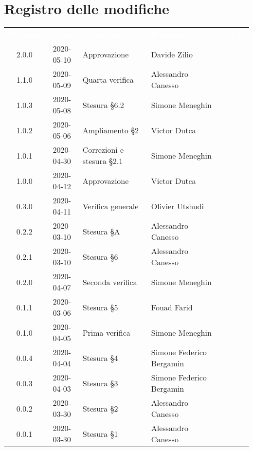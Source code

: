 \section*{Registro delle modifiche}
{
	\centering
	\begin{longtable}{ c c  C{4cm}  C{4cm}  C{3cm} }
		\textcolor{white}{\textbf{Versione}} & \textcolor{white}{\textbf{Data}} & \textcolor{white}{\textbf{Descrizione}} & \textcolor{white}{\textbf{Nominativo}} & \textcolor{white}{\textbf{Ruolo}}\\		
		2.0.0 & 2020-05-10 & Approvazione & Davide Zilio &\RdP{} \\
		1.1.0 & 2020-05-09 & Quarta verifica & Alessandro Canesso &\ver{} \\
		1.0.3 & 2020-05-08 & Stesura \S 6.2 & Simone Meneghin &\adm{} \\
		1.0.2 & 2020-05-06 & Ampliamento \S 2 & Victor Dutca &\Res{} \\
		1.0.1 & 2020-04-30 & Correzioni e stesura \S 2.1 & Simone Meneghin &\Res{} \\
		1.0.0 & 2020-04-12 & Approvazione & Victor Dutca &\RdP{} \\
		0.3.0 & 2020-04-11 & Verifica generale & Olivier Utshudi &\ver{} \\
		0.2.2 & 2020-03-10 & Stesura \S A & Alessandro Canesso &\Res{} \\
		0.2.1 & 2020-03-10 & Stesura \S 6 & Alessandro Canesso &\Res{} \\
		0.2.0 & 2020-04-07 & Seconda verifica & Simone Meneghin &\ver{} \\
		0.1.1 & 2020-03-06 & Stesura \S 5  & Fouad Farid &\Res{} \\
		0.1.0 & 2020-04-05 & Prima verifica & Simone Meneghin &\ver{} \\
		0.0.4 & 2020-04-04 & Stesura \S 4  & Simone Federico Bergamin &\adm{}\\	
		0.0.3 & 2020-04-03 & Stesura \S 3  & Simone Federico Bergamin &\adm{}\\	
		0.0.2 & 2020-03-30 & Stesura \S 2  & Alessandro Canesso &\Res{}\\	
		0.0.1 & 2020-03-30 & Stesura \S 1  & Alessandro Canesso &\Res{}\\		
	\end{longtable}
} 
